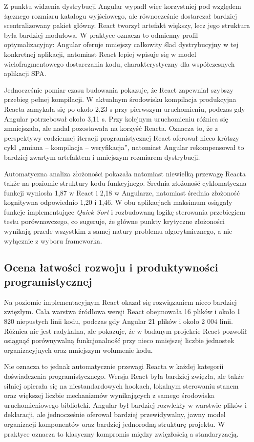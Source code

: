 \documentclass[12pt,openright,twoside]{report}
\begin{document}
Z punktu widzenia dystrybucji Angular wypadł więc korzystniej pod względem łącznego rozmiaru katalogu wyjściowego, ale równocześnie dostarczał bardziej scentralizowany pakiet główny. React tworzył artefakt większy, lecz jego struktura była bardziej modułowa. W praktyce oznacza to odmienny profil optymalizacyjny: Angular oferuje mniejszy całkowity ślad dystrybucyjny w tej konkretnej aplikacji, natomiast React lepiej wpisuje się w model wielofragmentowego dostarczania kodu, charakterystyczny dla współczesnych aplikacji SPA.

Jednocześnie pomiar czasu budowania pokazuje, że React zapewniał szybszy przebieg pełnej kompilacji. W aktualnym środowisku kompilacja produkcyjna Reacta zamykała się po około 2,23 s przy pierwszym uruchomieniu, podczas gdy Angular potrzebował około 3,11 s. Przy kolejnym uruchomieniu różnica się zmniejszała, ale nadal pozostawała na korzyść Reacta. Oznacza to, że z perspektywy codziennej iteracji programistycznej React oferował nieco krótszy cykl „zmiana -- kompilacja -- weryfikacja”, natomiast Angular rekompensował to bardziej zwartym artefaktem i mniejszym rozmiarem dystrybucji.

Automatyczna analiza złożoności pokazała natomiast niewielką przewagę Reacta także na poziomie struktury kodu funkcyjnego. Średnia złożoność cyklomatyczna funkcji wyniosła 1,87 w React i 2,18 w Angularze, natomiast średnia złożoność kognitywna odpowiednio 1,20 i 1,46. W obu aplikacjach maksimum osiągały funkcje implementujące \textit{Quick Sort} i rozbudowaną logikę sterowania przebiegiem testu porównawczego, co sugeruje, że główne punkty krytyczne złożoności wynikają przede wszystkim z samej natury problemu algorytmicznego, a nie wyłącznie z wyboru frameworka.

\subsection{Ocena łatwości rozwoju i produktywności programistycznej}
Na poziomie implementacyjnym React okazał się rozwiązaniem nieco bardziej zwięzłym. Cała warstwa źródłowa wersji React obejmowała 16 plików i około 1 820 niepustych linii kodu, podczas gdy Angular 21 plików i około 2 004 linii. Różnica nie jest radykalna, ale pokazuje, że w badanym projekcie React pozwolił osiągnąć porównywalną funkcjonalność przy nieco mniejszej liczbie jednostek organizacyjnych oraz mniejszym wolumenie kodu.

Nie oznacza to jednak automatycznie przewagi Reacta w każdej kategorii doświadczenia programistycznego. Wersja React była bardziej zwięzła, ale także silniej opierała się na niestandardowych hookach, lokalnym sterowaniu stanem oraz większej liczbie mechanizmów wynikających z samego środowiska uruchomieniowego biblioteki. Angular był bardziej rozwlekły w warstwie plików i deklaracji, ale jednocześnie oferował bardziej przewidywalny, jawny model organizacji komponentów oraz bardziej jednorodną strukturę projektu. W praktyce oznacza to klasyczny kompromis między zwięzłością a standaryzacją.
\end{document}
